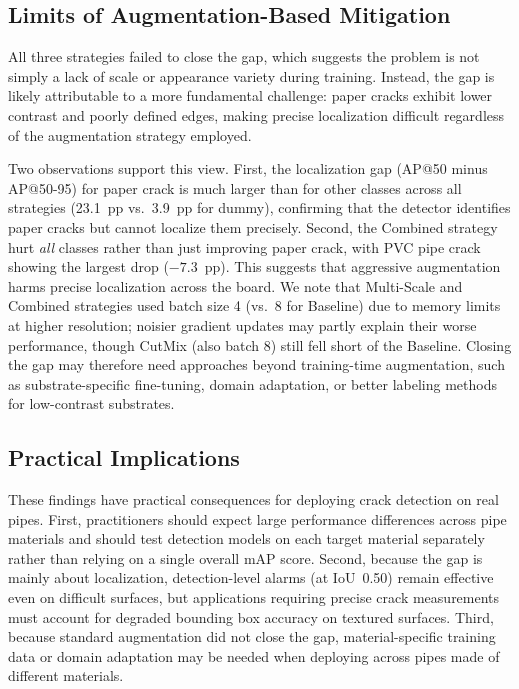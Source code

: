 \documentclass[conference]{IEEEtran}
\begin{document}
\subsection{Limits of Augmentation-Based Mitigation}

All three strategies failed to close the gap, which suggests the problem is not simply a lack of scale or appearance variety during training. Instead, the gap is likely attributable to a more fundamental challenge: paper cracks exhibit lower contrast and poorly defined edges, making precise localization difficult regardless of the augmentation strategy employed.

Two observations support this view. First, the localization gap (AP@50 minus AP@50-95) for paper crack is much larger than for other classes across all strategies (23.1~pp vs.\ 3.9~pp for dummy), confirming that the detector identifies paper cracks but cannot localize them precisely. Second, the Combined strategy hurt \textit{all} classes rather than just improving paper crack, with PVC pipe crack showing the largest drop ($-7.3$~pp). This suggests that aggressive augmentation harms precise localization across the board. We note that Multi-Scale and Combined strategies used batch size 4 (vs.\ 8 for Baseline) due to memory limits at higher resolution; noisier gradient updates may partly explain their worse performance, though CutMix (also batch 8) still fell short of the Baseline. Closing the gap may therefore need approaches beyond training-time augmentation, such as substrate-specific fine-tuning, domain adaptation, or better labeling methods for low-contrast substrates.

\subsection{Practical Implications}

These findings have practical consequences for deploying crack detection on real pipes. First, practitioners should expect large performance differences across pipe materials and should test detection models on each target material separately rather than relying on a single overall mAP score. Second, because the gap is mainly about localization, detection-level alarms (at IoU~0.50) remain effective even on difficult surfaces, but applications requiring precise crack measurements must account for degraded bounding box accuracy on textured surfaces. Third, because standard augmentation did not close the gap, material-specific training data or domain adaptation may be needed when deploying across pipes made of different materials.
\end{document}
